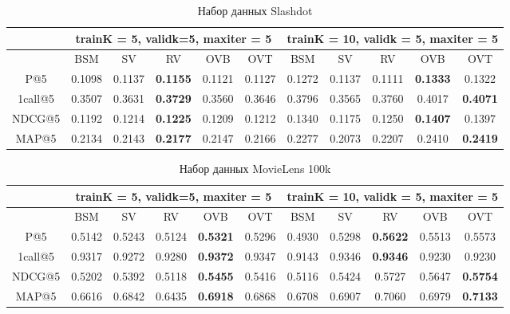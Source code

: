 \documentclass[a4paper,12pt]{article}
\begin{document}
\begin{table}[H]
\caption{Набор данных Slashdot}
\label{tab:movm}
\begin{tabular}{|c|c|c|c|c|c|c|c|c|c|c|}
\hline
& \multicolumn{5}{|c|}{trainK = 5, validk=5, maxiter = 5} & \multicolumn{5}{|c|}{trainK = 10, validk = 5, maxiter = 5}\\
\hline
  & BSM  & SV &  RV & OVB & OVT &BSM  & SV & RV & OVB & OVT \\
\hline
P@5 &  0.1098 &0.1137 &\textbf{0.1155} & 0.1121 & 0.1127& 0.1272 &0.1137 & 0.1111 &\textbf{0.1333} & 0.1322 \\
\hline
1call@5 &0.3507 & 0.3631& \textbf{0.3729} & 0.3560 & 0.3646 & 0.3796 & 0.3565&0.3760  & 0.4017 &\textbf{0.4071} \\
\hline
NDCG@5 & 0.1192&0.1214 & \textbf{0.1225}& 0.1209 & 0.1212& 0.1340 & 0.1175&0.1250  &\textbf{0.1407} &0.1397 \\
\hline
MAP@5 & 0.2134&0.2143 & \textbf{0.2177} & 0.2147 &0.2166 & 0.2277 & 0.2073 &0.2207&  0.2410& \textbf{0.2419}\\
\hline
\end{tabular}
\end{table}



\begin{table}[H]
\caption{Набор данных MovieLens 100k}
\label{tab:movm}
\begin{tabular}{|c|c|c|c|c|c|c|c|c|c|c|}
\hline
& \multicolumn{5}{|c|}{trainK = 5, validk=5, maxiter = 5} & \multicolumn{5}{|c|}{trainK = 10, validk = 5, maxiter = 5}\\
\hline
  & BSM  & SV &  RV & OVB & OVT &BSM  & SV & RV & OVB & OVT \\
\hline
P@5 & 0.5142 &0.5243 &0.5124 &\textbf{0.5321} &0.5296 &0.4930 & 0.5298 & \textbf{0.5622} &0.5513 & 0.5573 \\
\hline
1call@5 & 0.9317 & 0.9272& 0.9280 &\textbf{0.9372} &0.9347 & 0.9143& 0.9346& \textbf{0.9346}& 0.9230& 0.9230\\
\hline
NDCG@5 &0.5202 & 0.5392&0.5118 & \textbf{0.5455} & 0.5416&0.5116 & 0.5424 & 0.5727 &0.5647 & \textbf{0.5754}\\
\hline
MAP@5 & 0.6616 & 0.6842 &0.6435 & \textbf{0.6918} & 0.6868 & 0.6708&0.6907 & 0.7060 &0.6979 & \textbf{0.7133}\\
\hline
\end{tabular}
\end{table}
\end{document}
